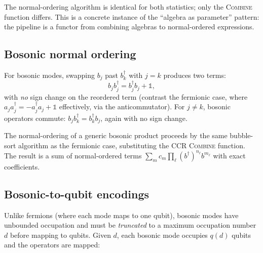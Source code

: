 The normal-ordering algorithm is identical for both statistics; only
the \textsc{Combine} function differs.  This is a concrete instance
of the ``algebra as parameter'' pattern: the pipeline is a functor
from combining algebras to normal-ordered expressions.

\subsection{Bosonic normal ordering}
\label{sec:ext-bosonic}

For bosonic modes, swapping $b_j$ past $b_k^\dagger$ with $j = k$
produces two terms:
\begin{equation}
  b_j b_j^\dagger = b_j^\dagger b_j + \mathbb{1},
  \label{eq:ccr-swap}
\end{equation}
with \emph{no} sign change on the reordered term (contrast the
fermionic case, where $a_j a_j^\dagger = -a_j^\dagger a_j +
\mathbb{1}$ effectively, via the anticommutator).  For $j \neq k$,
bosonic operators commute: $b_j b_k^\dagger = b_k^\dagger b_j$,
again with no sign change.

The normal-ordering of a generic bosonic product proceeds by the same
bubble-sort algorithm as the fermionic case, substituting the CCR
\textsc{Combine} function.  The result is a sum of normal-ordered
terms $\sum_m c_m \prod_\ell (b^\dagger)^{n_\ell} b^{m_\ell}$
with exact coefficients.

\subsection{Bosonic-to-qubit encodings}
\label{sec:ext-boson-qubit}

Unlike fermions (where each mode maps to one qubit), bosonic modes
have unbounded occupation and must be \emph{truncated} to a maximum
occupation number $d$ before mapping to qubits.  Given $d$, each
bosonic mode occupies $q(d)$ qubits and the operators are mapped:

